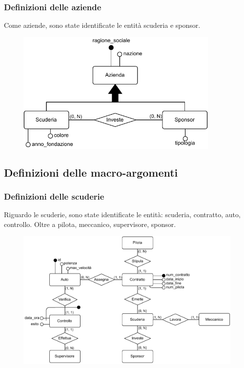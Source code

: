 \documentclass[11pt]{article}
\begin{document}
\subsubsection{Definizioni delle aziende}
Come aziende, sono state identificate le entità scuderia e sponsor. 
\begin{figure}[H]
    \centering
    \includegraphics[width=10cm]{../er/gare_aziende.pdf}
\end{figure}

\subsection{Definizioni delle macro-argomenti}
\subsubsection{Definizioni delle scuderie}
Riguardo le scuderie, sono state identificate le entità: scuderia, contratto, auto, controllo. Oltre a pilota, meccanico, supervisore, sponsor.
\begin{figure}[H]
    \centering
    \includegraphics[width=15.5cm]{../er/gare_scuderie.pdf}
\end{figure}
\end{document}
